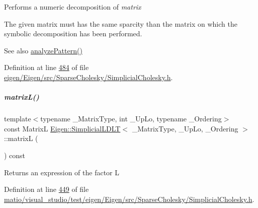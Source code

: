 Performs a numeric decomposition of {\itshape matrix} 

The given matrix must has the same sparcity than the matrix on which the symbolic decomposition has been performed.

\begin{DoxySeeAlso}{See also}
\hyperlink{group___sparse_cholesky___module_aaf7c852056195d05de863362638517b7}{analyze\+Pattern()} 
\end{DoxySeeAlso}


Definition at line \hyperlink{eigen_2_eigen_2src_2_sparse_cholesky_2_simplicial_cholesky_8h_source_l00484}{484} of file \hyperlink{eigen_2_eigen_2src_2_sparse_cholesky_2_simplicial_cholesky_8h_source}{eigen/\+Eigen/src/\+Sparse\+Cholesky/\+Simplicial\+Cholesky.\+h}.

\mbox{\label{group___sparse_cholesky___module_ae8f502eff0c95771115968510e4d9af5}} 
\subparagraph{\texorpdfstring{matrix\+L()}{matrixL()}\hspace{0.1cm}{\footnotesize\ttfamily [1/2]}}
{\footnotesize\ttfamily template$<$typename \+\_\+\+Matrix\+Type, int \+\_\+\+Up\+Lo, typename \+\_\+\+Ordering$>$ \\
const MatrixL \hyperlink{group___sparse_cholesky___module_class_eigen_1_1_simplicial_l_d_l_t}{Eigen\+::\+Simplicial\+L\+D\+LT}$<$ \+\_\+\+Matrix\+Type, \+\_\+\+Up\+Lo, \+\_\+\+Ordering $>$\+::matrixL (\begin{DoxyParamCaption}{ }\end{DoxyParamCaption}) const\hspace{0.3cm}{\ttfamily [inline]}}

\begin{DoxyReturn}{Returns}
an expression of the factor L 
\end{DoxyReturn}


Definition at line \hyperlink{matio_2visual__studio_2test_2eigen_2_eigen_2src_2_sparse_cholesky_2_simplicial_cholesky_8h_source_l00449}{449} of file \hyperlink{matio_2visual__studio_2test_2eigen_2_eigen_2src_2_sparse_cholesky_2_simplicial_cholesky_8h_source}{matio/visual\+\_\+studio/test/eigen/\+Eigen/src/\+Sparse\+Cholesky/\+Simplicial\+Cholesky.\+h}.

